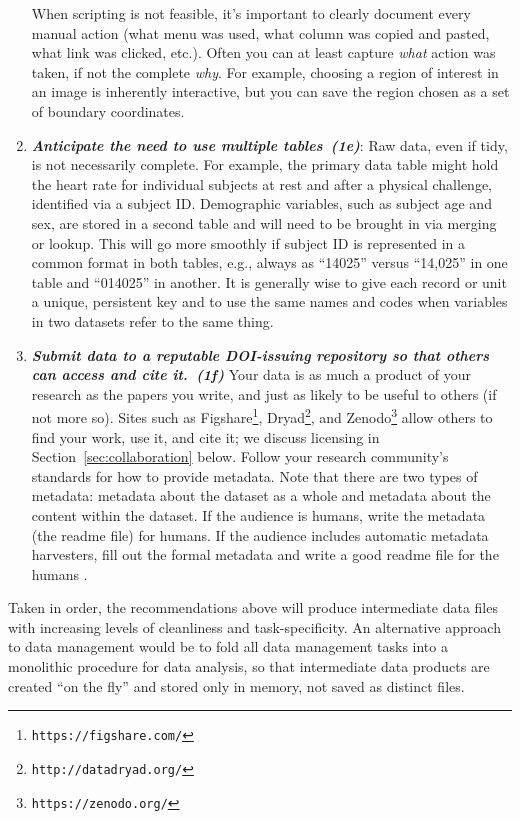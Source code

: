 \documentclass[10pt,letterpaper]{article}
\newcommand{\withurl}[2]{{#1}\footnote{{\texttt{#2}}}}
\newcommand{\practice}[2]{\textbf{\emph{{#2}~({#1})}}}
\begin{document}
\begin{enumerate}
  When scripting is not feasible, it's important to clearly document every manual action
  (what menu was used, what column was copied and pasted, what link was clicked, etc.).
  Often you can at least capture \emph{what} action was taken, if not the complete
  \emph{why}. For example, choosing a region of interest in an image is inherently
  interactive, but you can save the region chosen as a set of boundary coordinates.

\item
  \practice{1e}{Anticipate the need to use multiple tables}: Raw data, even if tidy, is not
  necessarily complete. For example, the primary data table might hold the heart rate for
  individual subjects at rest and after a physical challenge, identified via a subject ID.
  Demographic variables, such as subject age and sex, are stored in a second table and
  will need to be brought in via merging or lookup. This will go more smoothly if subject
  ID is represented in a common format in both tables, e.g., always as ``14025'' versus
  ``14,025'' in one table and ``014025'' in another. It is generally wise to give each
  record or unit a unique, persistent key and to use the same names and codes when
  variables in two datasets refer to the same thing.

\item
  \practice{1f}{Submit data to a reputable DOI-issuing repository so that
    others can access and cite it.}  Your data is as much a product of
  your research as the papers you write, and just as likely to be
  useful to others (if not more so).  Sites such as
  \withurl{Figshare}{https://figshare.com/},
  \withurl{Dryad}{http://datadryad.org/}, and
  \withurl{Zenodo}{https://zenodo.org/} allow others to find your work,
  use it, and cite it; we discuss licensing in
  Section~\ref{sec:collaboration} below. Follow your research community's
  standards for how to provide metadata. Note that there are two types
  of metadata: metadata about the dataset as a whole and metadata about
  the content within the dataset. If the audience is humans, write the
  metadata (the readme file) for humans. If the audience includes automatic
  metadata harvesters, fill out the formal metadata and write a good
  readme file for the humans \cite{wickes2015}.

\end{enumerate}

Taken in order, the recommendations above will produce intermediate
data files with increasing levels of cleanliness and
task-specificity. An alternative approach to data management would be
to fold all data management tasks into a monolithic procedure for data analysis,
so that intermediate data products are created ``on the fly'' and stored only in
memory, not saved as distinct files.
\end{document}
